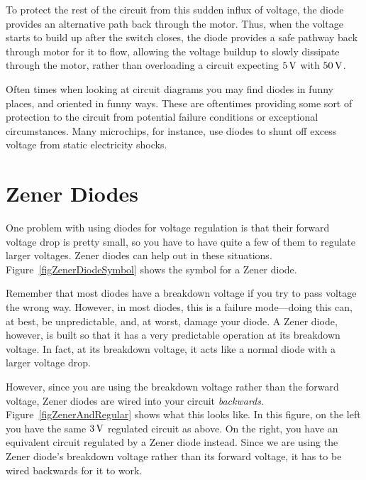 To protect the rest of the circuit from this sudden influx of voltage, the diode provides an alternative path back through the motor.
Thus, when the voltage starts to build up after the switch closes, the diode provides a safe pathway back through motor for it to flow, allowing the voltage buildup to slowly dissipate through the motor, rather than overloading a circuit expecting $5\,\si{\volt}$ with $50\,\si{\volt}$.

Often times when looking at circuit diagrams you may find diodes in funny places, and oriented in funny ways.
These are oftentimes providing some sort of protection to the circuit from potential failure conditions or exceptional circumstances.
Many microchips, for instance, use diodes to shunt off excess voltage from static electricity shocks.

\section{Zener Diodes}

One problem with using diodes for voltage regulation is that their forward voltage drop is pretty small, so you have to have quite a few of them to regulate larger voltages.
Zener diodes can help out in these situations.
Figure~\ref{figZenerDiodeSymbol} shows the symbol for a Zener diode.


Remember that most diodes have a breakdown voltage if you try to pass voltage the wrong way.
However, in most diodes, this is a failure mode---doing this can, at best, be unpredictable, and, at worst, damage your diode.
A Zener diode, however, is built so that it has a very predictable operation at its breakdown voltage.
In fact, at its breakdown voltage, it acts like a normal diode with a larger voltage drop.

However, since you are using the breakdown voltage rather than the forward voltage, Zener diodes are wired into your circuit \emph{backwards}.
Figure~\ref{figZenerAndRegular} shows what this looks like.
In this figure, on the left you have the same $3\,\si{\volt}$ regulated circuit as above.
On the right, you have an equivalent circuit regulated by a Zener diode instead.
Since we are using the Zener diode's breakdown voltage rather than its forward voltage, it has to be wired backwards for it to work.


